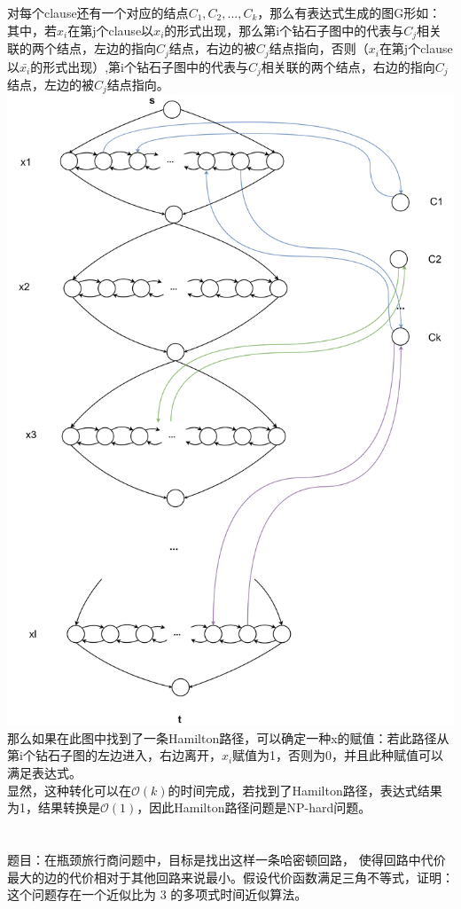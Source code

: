 \documentclass[UTF8]{ctexart}
\begin{document}
对每个clause还有一个对应的结点$C_1,C_2,...,C_k$，那么有表达式生成的图G形如：\\
其中，若$x_i$在第j个clause以$x_i$的形式出现，那么第i个钻石子图中的代表与$C_j$相关联的两个结点，左边的指向$C_j$结点，右边的被$C_j$结点指向，否则（$x_i$在第j个clause以$\bar{x_i}$的形式出现）,第i个钻石子图中的代表与$C_j$相关联的两个结点，右边的指向$C_j$结点，左边的被$C_j$结点指向。\\
\includegraphics[scale=0.15]{3.png}\\
那么如果在此图中找到了一条Hamilton路径，可以确定一种x的赋值：若此路径从第i个钻石子图的左边进入，右边离开，$x_i$赋值为1，否则为0，并且此种赋值可以满足表达式。\\
显然，这种转化可以在$\mathcal{O}(k)$的时间完成，若找到了Hamilton路径，表达式结果为1，结果转换是$\mathcal{O}(1)$，因此Hamilton路径问题是NP-hard问题。
\section{}
题目：在瓶颈旅行商问题中，目标是找出这样一条哈密顿回路， 使得回路中代价最大的边的代价相对于其他回路来说最小。假设代价函数满足三角不等式，证明：这个问题存在一个近似比为 3 的多项式时间近似算法。
\end{document}
